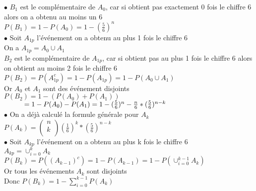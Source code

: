 \documentclass{article}
\newcommand\tab[1][1cm]{\hspace*{#1}}
\begin{document}
$\bullet$ $B_1$ est le complémentaire de $A_0$, car si obtient pas exactement 0 fois le chiffre 6
alors on a obtenu au moins un 6\\
$P(B_1) = 1 - P(A_0) = 1 - (\frac{5}{6})^n$\\
$\bullet$ Soit $A_{1p}$ l'événement on a obtenu au plus 1 fois le chiffre 6\\
On a $A_{1p} = A_0 \cup A_{1}$\\
$B_2$ est le complémentaire de $A_{1p}$, car si obtient pas au plus 1 fois le chiffre 6 alors on obtient au moins 2 fois le chiffre 6\\
$P(B_2) = P(A_{1p}^c) = 1 - P(A_{1p}) = 1 - P(A_0 \cup A_1)$\\
Or $A_0$ et $A_1$ sont des événement disjoints\\
$P(B_2) = 1 - (P(A_0) + P(A_1))$\\
$\tab = 1 - P(A_0) - P(A_1) = 1 - (\frac{5}{6})^n - \frac{n}{6} * (\frac{5}{6})^{n - k}$\\
$\bullet$ On a déjà calculé la formule générale pour $A_k$\\
$P(A_k) = \begin{pmatrix}
    n\\
    k\\
\end{pmatrix} (\frac{1}{6})^k * (\frac{5}{6})^{n - k}$\\
\newpage
\noindent $\bullet$ Soit $A_{kp}$ l'événement on a obtenu au plus k fois le chiffre 6\\
$A_{kp} = \cup_{i=0}^{k} A_k$\\
$P(B_k) = P((A_{k - 1})^c) = 1 - P(A_{k - 1})  = 1 - P(\cup_{i=0}^{k-1} A_k)$\\
Or tous les événements $A_k$ sont disjoints\\
Donc $P(B_k) = 1 - \sum_{i=0}^{k-1} P(A_k)$\\
\end{document}
